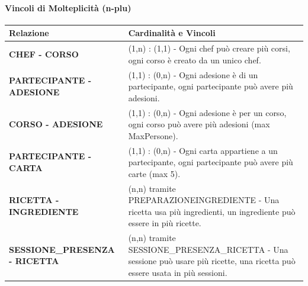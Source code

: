 \paragraph{Vincoli di Molteplicità (n-plu)}

\begin{center}
\begin{tcolorbox}[colback=white!98!gray, colframe=myblue!80!black, title=Vincoli di Molteplicità, arc=4mm, boxrule=0.8pt, width=0.98\textwidth]
\renewcommand{\arraystretch}{1.2}
\begin{tabularx}{\textwidth}{p{5cm}X}
\textbf{Relazione} & \textbf{Cardinalità e Vincoli} \\
\hline
\textbf{CHEF - CORSO} & (1,n) : (1,1) - Ogni chef può creare più corsi, ogni corso è creato da un unico chef. \\
\hline
\textbf{PARTECIPANTE - ADESIONE} & (1,1) : (0,n) - Ogni adesione è di un partecipante, ogni partecipante può avere più adesioni. \\
\hline
\textbf{CORSO - ADESIONE} & (1,1) : (0,n) - Ogni adesione è per un corso, ogni corso può avere più adesioni (max MaxPersone). \\
\hline
\textbf{PARTECIPANTE - CARTA} & (1,1) : (0,n) - Ogni carta appartiene a un partecipante, ogni partecipante può avere più carte (max 5). \\
\hline
\textbf{RICETTA - INGREDIENTE} & (n,n) tramite PREPARAZIONEINGREDIENTE - Una ricetta usa più ingredienti, un ingrediente può essere in più ricette. \\
\hline
\textbf{SESSIONE\_PRESENZA - RICETTA} & (n,n) tramite SESSIONE\_PRESENZA\_RICETTA - Una sessione può usare più ricette, una ricetta può essere usata in più sessioni. \\
\hline
\end{tabularx}
\end{tcolorbox}
\end{center}



